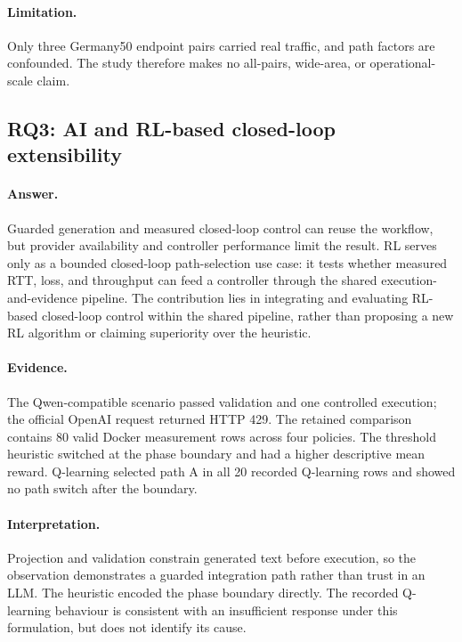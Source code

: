 \paragraph{Limitation.} Only three Germany50 endpoint pairs carried real traffic, and path factors are confounded. The study therefore makes no all-pairs, wide-area, or operational-scale claim.

\subsection{RQ3: AI and RL-based closed-loop extensibility}

\paragraph{Answer.} Guarded generation and measured closed-loop control can reuse the workflow, but provider availability and controller performance limit the result. RL serves only as a bounded closed-loop path-selection use case: it tests whether measured RTT, loss, and throughput can feed a controller through the shared execution-and-evidence pipeline. The contribution lies in integrating and evaluating RL-based closed-loop control within the shared pipeline, rather than proposing a new RL algorithm or claiming superiority over the heuristic.

\paragraph{Evidence.} The Qwen-compatible scenario passed validation and one controlled execution; the official OpenAI request returned HTTP 429. The retained comparison contains 80 valid Docker measurement rows across four policies. The threshold heuristic switched at the phase boundary and had a higher descriptive mean reward. Q-learning selected path A in all 20 recorded Q-learning rows and showed no path switch after the boundary.

\paragraph{Interpretation.} Projection and validation constrain generated text before execution, so the observation demonstrates a guarded integration path rather than trust in an LLM. The heuristic encoded the phase boundary directly. The recorded Q-learning behaviour is consistent with an insufficient response under this formulation, but does not identify its cause.

